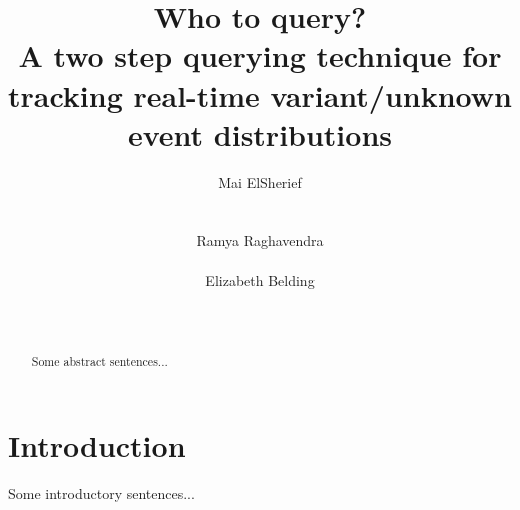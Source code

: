 \documentclass{acm_proc_article-sp}
\begin{document}
\title{Who to query? \\A two step querying technique for tracking real-time variant/unknown event distributions }

\author{
%
%
\alignauthor
Mai ElSherief\\
     \\
     \\
     \alignauthor
Ramya Raghavendra\\
     \\
\alignauthor
Elizabeth Belding\\
    \\
     \\
}

\maketitle


\begin{abstract}
Some abstract sentences...

\end{abstract}


\section{Introduction}

Some introductory sentences...
\end{document}
